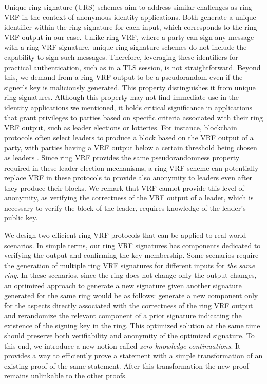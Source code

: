 Unique ring signature (URS) schemes \cite{URCframework} aim to address similar challenges as ring VRF in the context of anonymous identity applications. Both generate a unique identifier within the ring signature for each input, which corresponds to the ring VRF output in our case. Unlike ring VRF, where a party can sign any message with a ring VRF signature, unique ring signature schemes do not include the capability to sign such messages. Therefore, leveraging these identifiers for practical authentication, such as in a TLS session, is not straightforward. 
Beyond this, we demand from a ring VRF output  to be a pseudorandom even if the signer's key is maliciously generated. This property distinguishes it from unique ring signatures. 
Although this property may not find immediate use in the identity applications we mentioned, it holds critical significance in applications that grant privileges to parties based on specific criteria associated with their ring VRF output, such as leader elections or lotteries. 
For instance, blockchain protocols often select leaders to produce a block  based on the VRF output of a party, with parties having a VRF output below a certain threshold being chosen as leaders \cite{praos,genesis}. Since ring VRF provides the same pseudorandomness property required in these leader election mechanisms, a ring VRF scheme  can potentially replace VRF in these protocols to provide also anonymity to leaders even after they produce their blocks. 
We remark that VRF cannot provide this level of anonymity, as verifying the correctness of the VRF output  of a leader, which is necessary to verify the block of the leader, requires knowledge of the leader's public key.



We design two efficient ring VRF protocols that can be applied to real-world scenarios.
In simple terms,  our ring VRF signatures has components dedicated to verifying the output and confirming the key membership. Some scenarios require the generation of multiple ring VRF signatures for different inputs for \emph{the same ring}. In these scenarios, since the ring does not change only the output changes, an optimized approach to generate a new signature given another signature generated for the same ring would be as follows:  generate a new component only for the aspects directly associated with the correctness of the ring VRF output and  rerandomize the relevant component of a prior signature indicating the existence of the signing key in the ring. This optimized solution at the same time should preserve both verifiability and anonymity of the optimized signature.
To this end, we introduce a  new notion called \emph{zero-knowledge continuations}. It provides a way to efficiently prove a statement with a simple transformation of an existing proof of the same statement. After this transformation the new proof remains unlinkable to the other proofs. 

